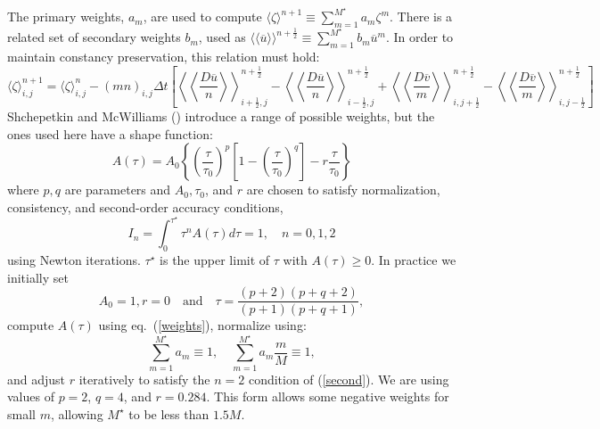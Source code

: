 The primary weights, $a_m$, are used to compute $\langle \zeta
\rangle^{n+1} \equiv \sum_{m=1}^{M^\star} a_m \zeta^m$. There is a
related set of secondary weights $b_m$, used as $\langle \! \langle
\overline{u} \rangle \! \rangle^{n+\frac{1}{2}} \equiv \sum_{m=1}^{M^\star} b_m
\overline{u}^m$. In order to maintain constancy preservation, this
relation must hold:
\begin{equation}
  \langle \zeta \rangle_{i,j}^{n+1} = \langle \zeta \rangle_{i,j}^n -
  (mn)_{i,j} \Delta t \left[ \left\langle \!\! \left\langle
  \frac{D\overline u}{n} \right\rangle \!\!
  \right\rangle_{i+\frac{1}{2},j}^{n+\frac{1}{2}}
  - \left\langle \!\! \left\langle \frac{D\overline u}{n} \right\rangle
  \!\! \right\rangle_{i-\frac{1}{2},j}^{n+\frac{1}{2}} +
  \left\langle \!\! \left\langle
  \frac{D\overline v}{m} \right\rangle \!\!
  \right\rangle_{i,j+\frac{1}{2}}^{n+\frac{1}{2}}
  - \left\langle \!\! \left\langle \frac{D\overline v}{m} \right\rangle
  \!\! \right\rangle_{i,j-\frac{1}{2}}^{n+\frac{1}{2}} \right]
\label{zeta3}
\end{equation}
Shchepetkin and McWilliams (\cite{SS2005}) introduce a range of
possible weights, but the ones used here have a shape function:
\begin{equation}
   A(\tau) = A_0 \left\{ \left( \frac{\tau}{\tau_0} \right)^p \left[ 1-
   \left(\frac{\tau}{\tau_0} \right)^q \right] - r \frac{\tau}{\tau_0}
   \right\}
\label{weights}
\end{equation}
where $p, q$ are parameters and $A_0, \tau_0$, and $r$ are chosen to
satisfy normalization, consistency, and second-order accuracy
conditions,
\begin{equation}
   I_n = \int_0^{\tau^\star} \tau^n A(\tau) d \tau = 1, \quad n=0,1,2
\label{second}
\end{equation}
using Newton iterations. $\tau^\star$ is the upper limit of $\tau$
with $A(\tau) \geq 0$. In practice we initially set
$$
  A_0 = 1, r = 0 \quad \mbox{and} \quad
  \tau = \frac{(p+2)(p+q+2)}{(p+1)(p+q+1)},
$$
compute $A(\tau)$ using eq.~(\ref{weights}), normalize using:
\begin{equation}
   \sum_{m=1}^{M^\star} a_m \equiv 1, \quad
   \sum_{m=1}^{M^\star} a_m\frac{m}{M} \equiv 1,
\end{equation}
and adjust $r$ iteratively to satisfy the $n=2$ condition of
(\ref{second}). We are using values of $p=2$, $q=4$, and $r=0.284$.
This form allows some negative weights for small $m$, allowing
$M^\star$ to be less than $1.5M$.

